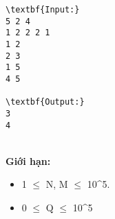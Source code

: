 \begin{verbatim}
\textbf{Input:}
5 2 4
1 2 2 2 1
1 2
2 3
1 5
4 5

\textbf{Output:}
3
4\end{verbatim}
\\\textbf{Giới hạn:} 
\begin{itemize}
	\item 1  $\le$  N, M  $\le$  10^5.
	\item 0  $\le$  Q  $\le$  10^5
\end{itemize}
